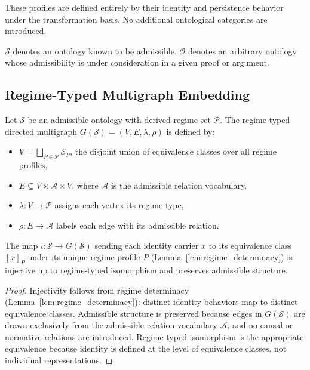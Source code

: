 These profiles are defined entirely by their identity and persistence
behavior under the transformation basis.
No additional ontological categories are introduced.

\begin{convention}
  $\mathcal{S}$ denotes an ontology known to be admissible.
  $\mathcal{O}$ denotes an arbitrary ontology whose admissibility
  is under consideration in a given proof or argument.
\end{convention}


\subsection{Regime-Typed Multigraph Embedding}
\label{subsec:refinement_construction}

\begin{definition}
\label{def:regime_multigraph}
Let $\mathcal{S}$ be an admissible ontology with derived regime set
$\mathcal{P}$. The regime-typed directed multigraph
$G(\mathcal{S}) = (V, E, \lambda, \rho)$ is defined by:
\begin{itemize}
  \item $V = \bigsqcup_{P \in \mathcal{P}} \mathcal{E}_P$,
        the disjoint union of equivalence classes over all regime profiles,
  \item $E \subseteq V \times \mathcal{A} \times V$,
        where $\mathcal{A}$ is the admissible relation vocabulary,
  \item $\lambda : V \to \mathcal{P}$ assigns each vertex its regime type,
  \item $\rho : E \to \mathcal{A}$ labels each edge with its admissible relation.
\end{itemize}
\end{definition}

\begin{theorem}
\label{thm:embedding}
The map $\iota : \mathcal{S} \to G(\mathcal{S})$ sending each
identity carrier $x$ to its equivalence class $[x]_P$
under its unique regime profile $P$ (Lemma~\ref{lem:regime_determinacy})
is injective up to regime-typed isomorphism and preserves admissible structure.
\end{theorem}

\begin{proof}
Injectivity follows from regime determinacy
(Lemma~\ref{lem:regime_determinacy}): distinct identity behaviors
map to distinct equivalence classes.
Admissible structure is preserved because edges in $G(\mathcal{S})$
are drawn exclusively from the admissible relation vocabulary $\mathcal{A}$,
and no causal or normative relations are introduced.
Regime-typed isomorphism is the appropriate equivalence
because identity is defined at the level of equivalence classes,
not individual representations.
\end{proof}

